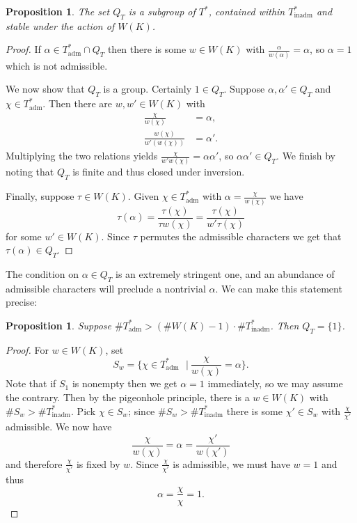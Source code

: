 \documentclass[11pt]{amsart}
\theoremstyle{plain}
\newtheorem{proposition}[theorem]{Proposition}
\theoremstyle{definition}
\newcommand{\st}{\ensuremath{\ \ \ \vert\ }}
\newcommand{\Thadm}{T^*_{\operatorname{adm}}}
\newcommand{\Thinadm}{T^*_{\operatorname{inadm}}}
\newcommand{\hatT}{T^*}
\begin{document}
\begin{proposition} \label{irr-sub}
The set $Q_T$ is a subgroup of $\hatT$, contained within $\Thinadm$ and stable under the action of $W(K)$.
\end{proposition}
\begin{proof}
If $\alpha \in \Thadm \cap Q_T$ then there is some $w \in W(K)$ with
$\frac{\alpha}{w(\alpha)} = \alpha$, so $\alpha = 1$ which is not admissible.

We now show that $Q_T$ is a group.  Certainly $1 \in Q_T$.  Suppose
$\alpha, \alpha' \in Q_T$ and $\chi \in \Thadm$.  Then there are $w, w' \in W(K)$ with
\begin{align*}
\frac{\chi}{w(\chi)} &= \alpha, \\
\frac{w(\chi)}{w'(w(\chi))} &= \alpha'.
\end{align*}
Multiplying the two relations yields $\frac{\chi}{w'w(\chi)} = \alpha\alpha'$, so
$\alpha\alpha' \in Q_T$.  We finish by noting that $Q_T$ is finite and thus closed under inversion.

Finally, suppose $\tau \in W(K)$.  Given $\chi \in \Thadm$ with $\alpha = \frac{\chi}{w(\chi)}$ we have
$$\tau(\alpha) = \frac{\tau(\chi)}{\tau w(\chi)} = \frac{\tau(\chi)}{w' \tau(\chi)}$$
for some $w' \in W(K)$.  Since $\tau$ permutes the admissible characters we get that $\tau(\alpha) \in Q_T$.
\end{proof}

The condition on $\alpha \in Q_T$ is an extremely stringent one, and an abundance of admissible
characters will preclude a nontrivial $\alpha$.  We can make this statement precise:

\begin{proposition} \label{pigeonhole}
Suppose $\#\Thadm > (\# W(K) - 1) \cdot \# \Thinadm$.  Then $Q_T = \{ 1 \}$.
\end{proposition}
\begin{proof}
For $w \in W(K)$, set
$$S_w = \{\chi \in \Thadm \st  \frac{\chi}{w(\chi)} = \alpha\}.$$
Note that if $S_1$ is nonempty then we get $\alpha = 1$ immediately, so we may
assume the contrary.  Then by the pigeonhole principle, there is a $w \in W(K)$
with $\# S_w > \# \Thinadm$.  Pick $\chi \in S_w$; since $\# S_w > \#\Thinadm$
there is some $\chi' \in S_w$ with $\frac{\chi}{\chi'}$ admissible.  We now have
$$\frac{\chi}{w(\chi)} = \alpha = \frac{\chi'}{w(\chi')}$$
and therefore $\frac{\chi}{\chi'}$ is fixed by $w$.  Since $\frac{\chi}{\chi'}$ is admissible, we must have $w = 1$ and thus
$$\alpha = \frac{\chi}{\chi} = 1.$$
\end{proof}
\end{document}
